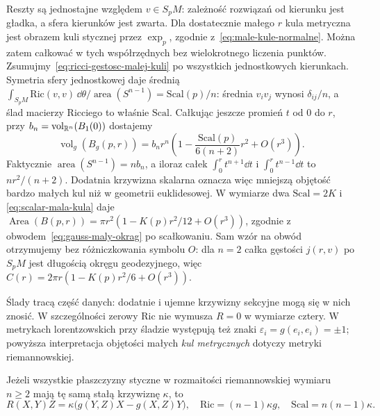 Reszty są jednostajne względem $v\in S_pM$: zależność
rozwiązań od kierunku jest gładka, a sfera kierunków
jest zwarta. Dla dostatecznie małego $r$ kula metryczna
jest obrazem kuli stycznej przez $\exp_p$, zgodnie
z~\eqref{eq:male-kule-normalne}. Można zatem całkować
w tych współrzędnych bez wielokrotnego liczenia punktów.
Zsumujmy~\eqref{eq:ricci-gestosc-malej-kuli} po
wszystkich jednostkowych kierunkach. Symetria sfery
jednostkowej daje średnią
$\int_{S_pM}\mathrm{Ric}(v,v)\,\dd\theta/
\operatorname{area}(S^{n-1})=\mathrm{Scal}(p)/n$:
średnia $v_iv_j$ wynosi $\delta_{ij}/n$, a ślad
macierzy Ricciego to właśnie $\mathrm{Scal}$.
Całkując jeszcze promień $t$ od $0$ do $r$, przy
$b_n=\operatorname{vol}_{\mathbb{R}^n}(B_1(0))$ dostajemy
\begin{equation}\label{eq:scalar-mala-kula}
 \operatorname{vol}_g(B_g(p,r))
 =b_nr^n\left(1-\frac{\mathrm{Scal}(p)}{6(n+2)}r^2
                                      +O(r^3)\right).
\end{equation}
Faktycznie $\operatorname{area}(S^{n-1})=nb_n$,
a iloraz całek $\int_0^r t^{n+1}\dd t$ i
$\int_0^r t^{n-1}\dd t$ to $nr^2/(n+2)$.
Dodatnia krzywizna skalarna oznacza więc mniejszą
objętość bardzo małych kul niż w geometrii euklidesowej.
W wymiarze dwa $\mathrm{Scal}=2K$ i
\eqref{eq:scalar-mala-kula} daje
$\operatorname{Area}(B(p,r))
=\pi r^2(1-K(p)r^2/12+O(r^3))$, zgodnie z
obwodem~\eqref{eq:gauss-maly-okrag} po scałkowaniu.
Sam wzór na obwód otrzymujemy bez różniczkowania symbolu $O$:
dla $n=2$ całka gęstości $j(r,v)$ po $S_pM$ jest długością
okręgu geodezyjnego, więc
$C(r)=2\pi r(1-K(p)r^2/6+O(r^3))$.

Ślady tracą część danych: dodatnie i ujemne krzywizny
sekcyjne mogą się w nich znosić. W szczególności zerowy
$\mathrm{Ric}$ nie wymusza $R=0$ w wymiarze cztery.
W metrykach lorentzowskich przy śladzie występują też
znaki $\varepsilon_i=g(e_i,e_i)=\pm1$; powyższa
interpretacja objętości małych \emph{kul metrycznych}
dotyczy metryki riemannowskiej.

\begin{twierdzenie}
\label{thm:stala-krzywizna}
Jeżeli wszystkie płaszczyzny styczne w rozmaitości
riemannowskiej wymiaru $n\geq2$ mają tę samą stałą
krzywiznę $\kappa$, to
\begin{equation}\label{eq:stala-krzywizna-tensor}
 R(X,Y)Z=\kappa\bigl(g(Y,Z)X-g(X,Z)Y\bigr),
 \quad \mathrm{Ric}=(n-1)\kappa g,
 \quad \mathrm{Scal}=n(n-1)\kappa.
\end{equation}
\end{twierdzenie}

